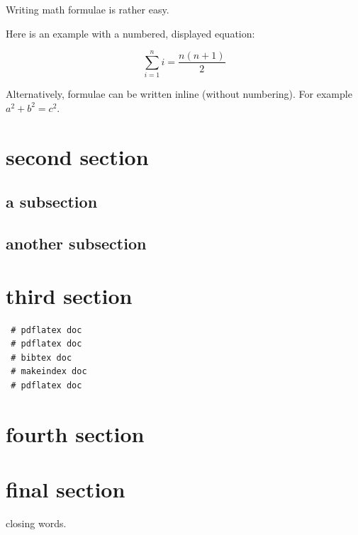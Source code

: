 \documentclass[12pt,a4paper]{article}
\begin{document}
Writing math formulae is rather easy. 

Here is an example with a numbered, displayed equation:


\begin{equation}
\label{eq:example}
\sum_{i=1}^{n}i = \frac{n(n+1)}{2}
\end{equation}


 Alternatively, formulae can be written inline (without numbering). For example $a^2 + b^2 = c^2$.

\section{second section}

\subsection{a subsection}


\subsection{another subsection}


\section{third section}


\begin{lstlisting}
 # pdflatex doc
 # pdflatex doc
 # bibtex doc
 # makeindex doc
 # pdflatex doc
\end{lstlisting}


\section{fourth section}







\section{final section}

closing words.



{}
\printindex



{}
{}
\end{document}
